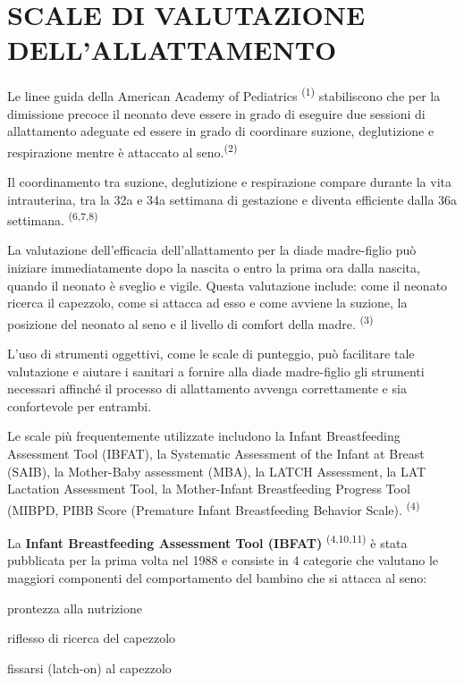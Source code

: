 \documentclass[]{article}
\begin{document}
\hypertarget{scale-di-valutazione-dellallattamento}{%
\section{SCALE DI VALUTAZIONE
DELL'ALLATTAMENTO}\label{scale-di-valutazione-dellallattamento}}

Le linee guida della American Academy of Pediatrics
\textsuperscript{(1)} stabiliscono che per la dimissione precoce il
neonato deve essere in grado di eseguire due sessioni di allattamento
adeguate ed essere in grado di coordinare suzione, deglutizione e
respirazione mentre è attaccato al seno.\textsuperscript{(2)}

Il coordinamento tra suzione, deglutizione e respirazione compare
durante la vita intrauterina, tra la 32a e 34a settimana di gestazione e
diventa efficiente dalla 36a settimana. \textsuperscript{(6,7,8) }

La valutazione dell'efficacia dell'allattamento per la diade
madre-figlio può iniziare immediatamente dopo la nascita o entro la
prima ora dalla nascita, quando il neonato è sveglio e vigile. Questa
valutazione include: come il neonato ricerca il capezzolo, come si
attacca ad esso e come avviene la suzione, la posizione del neonato al
seno e il livello di comfort della madre. \textsuperscript{(3)}

L'uso di strumenti oggettivi, come le scale di punteggio, può facilitare
tale valutazione e aiutare i sanitari a fornire alla diade madre-figlio
gli strumenti necessari affinché il processo di allattamento avvenga
correttamente e sia confortevole per entrambi.

Le scale più frequentemente utilizzate includono la Infant Breastfeeding
Assessment Tool (IBFAT), la Systematic Assessment of the Infant at
Breast (SAIB), la Mother-Baby assessment (MBA), la LATCH Assessment, la
LAT Lactation Assessment Tool, la Mother-Infant Breastfeeding Progress
Tool (MIBPD, PIBB Score (Premature Infant Breastfeeding Behavior Scale).
\textsuperscript{(4)}

La \textbf{Infant Breastfeeding Assessment Tool (IBFAT)}
\textsuperscript{(4,10,11)} è stata pubblicata per la prima volta nel
1988 e consiste in 4 categorie che valutano le maggiori componenti del
comportamento del bambino che si attacca al seno:

prontezza alla nutrizione

riflesso di ricerca del capezzolo

fissarsi (latch-on) al capezzolo
\end{document}
